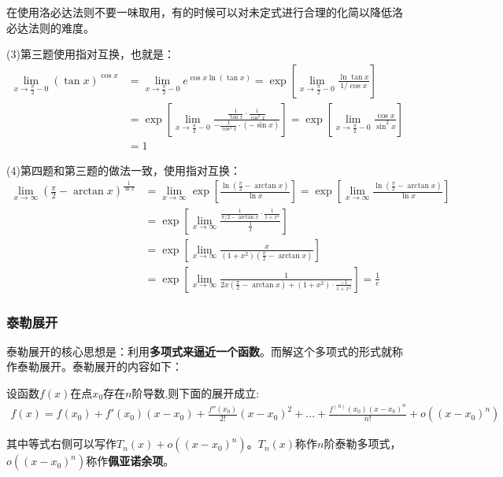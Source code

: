 \documentclass{ctexart}
\let\oldtextbf\textbf %
\renewcommand{\textbf}[1]{\textcolor{btex}{\oldtextbf{#1}}} %
\begin{document}
在使用洛必达法则不要一味取用，有的时候可以对未定式进行合理的化简以降低洛必达法则的难度。

(3)第三题使用指对互换，也就是：
\begin{align*}
 \lim_{x\to \frac{\pi}{2}-0 }(\tan x)^{\cos x}&=\lim_{x\to \frac{\pi}{2}-0 }e^{\cos x\ln(\tan x)}
=\exp[\lim_{x\to \frac{\pi}{2}-0}\frac{\ln \tan x}{1/\cos x} ]\\
&=\exp\left[\lim_{x\to \frac{\pi}{2}-0}\frac{\frac{1}{\tan x}\cdot\frac{1}{\cos^2 x}  }{-\frac{1}{\cos ^2 x}
\cdot(-\sin x) }\right]=\exp\left[\lim_{x\to \frac{\pi}{2}-0}\frac{\cos x}{\sin ^2 x}\right]\\
&=1
\end{align*}

(4)第四题和第三题的做法一致，使用指对互换：
\begin{align*}
\lim_{x\to\infty}(\frac{\pi}{2}-\arctan x)^{\frac{1}{\ln x}}&=\lim_{x\to\infty}
\exp\left[\frac{\ln(\frac{\pi}{2}-\arctan x) }{\ln x} \right]=
\exp\left[\lim_{x\to\infty}\frac{\ln(\frac{\pi}{2}-\arctan x) }{\ln x} \right]\\
&=\exp\left[\lim_{x\to\infty}\frac{\frac{1}{\pi/2-\arctan x}\cdot\frac{1}{1+x^2} }{\frac{1}{x}}  \right]\\
&=\exp\left[\lim_{x\to\infty}\frac{x}{(1+x^2)(\frac{\pi}{2}-\arctan x)}\right]\\
&=\exp\left[\lim_{x\to\infty}\frac{1}{2x(\frac{\pi}{2}-\arctan x)+(1+x^2)\cdot\frac{-1}{1+x^2} }\right]=\frac{1}{e} 
\end{align*}

\subsubsection{泰勒展开}
泰勒展开的核心思想是：利用\textbf{多项式来逼近一个函数}。而解这个多项式的形式就称作泰勒展开。泰勒展开的内容如下：
\begin{tcolorbox}[
    colback=bac1,     %
    colframe=fra1,   %
    coltitle=white,             %
    coltext=tex1,
    title=Taylor泰勒展开,
    fonttitle=\bfseries,        %
arc=3mm,                     %
breakable
]
设函数$f(x)$在点$x_0$存在$n$阶导数,则下面的展开成立:
\begin{align*}
    f(x)=f(x_0)+f'(x_0)(x-x_0)+\frac{f''(x_0)}{2!}(x-x_0)^2+...+\frac{f^{(n)}(x_0)(x-x_0)^n}{n!}+o((x-x_0)^n)\tag{3-5}
\end{align*}

其中等式右侧可以写作$T_n(x)+o((x-x_0)^n)$。$T_n(x)$称作$n$阶泰勒多项式，$o((x-x_0)^n)$称作\textbf{佩亚诺余项}。
\end{tcolorbox}
\end{document}
